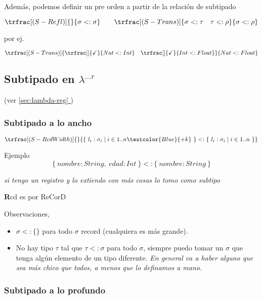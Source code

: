 \documentclass{report}
\newcommand*{\fullref}[1]{\hyperref[{#1}]{\autoref*{#1} \nameref*{#1}}}
\theoremstyle{definition} %
\newenvironment{nota}[1]
    {\begin{leftbar}\textbf{#1}}
    {\end{leftbar}}
\newcommand{\lambdareg}{\lambda^{\dots r}}
\newcommand{\reg}[1]{\{\ #1\ \}}
\newcommand{\treg}[1]{\{ #1 \}}
\newcommand{\deriv}[3]{\trfrac[(#1)]{#2}{#3}}
\newcommand{\derivok}[1]{\trfrac[]{\checkmark}{#1}}
\newcommand{\select}[1]{\textcolor{Blue}{#1}}
\newcommand{\subt}[2]{#1 <: #2}
\begin{document}
Además, podemos definir un pre orden a partir de la relación de subtipado

\[
    \deriv{S-Refl}
        {}
        {\subt{\sigma}{\sigma}}
    \qquad
    \deriv{S-Trans}
        {\subt{\sigma}{\tau} \quad \subt{\tau}{\rho}}
        {\subt{\sigma}{\rho}}
\]

por ej.

\[
    \deriv{S-Trans}
        {\derivok{\subt{Nat}{Int}} \quad \derivok{\subt{Int}{Float}}}
        {\subt{Nat}{Float}}
\]

\subsection{Subtipado en $\lambdareg$}

(ver \fullref{sec:lambda-reg})

\subsubsection{Subtipado \textbf{a lo ancho}}

\[
    \deriv{S-RcdWidth}
        {}
        {
            \subt
                {\reg{l_i : \sigma_i \mid i \in 1..n\select{+k}}}
                {\reg{l_i : \sigma_i \mid i \in 1..n}}
        }
\]

Ejemplo
\[
    \subt{\reg{nombre: String,\ edad: Int}}{\reg{nombre: String}}
\]

\textit{si tengo un registro y lo extiendo con más cosas lo tomo como subtipo}

\begin{nota}
    Rcd es por ReCorD
\end{nota}

Observaciones,

\begin{itemize}
    \item $\subt{\sigma}{\treg{}}$ para todo $\sigma$ record (cualquiera es
    más grande).
    \item No hay tipo $\tau$ tal que $\subt{\tau}{\sigma}$ para todo $\sigma$,
    siempre puedo tomar un $\sigma$ que tenga algún elemento de un tipo
    diferente. \textit{En general va a haber alguno que sea más chico que todos,
    a menos que lo definamos a mano.}
\end{itemize}

\subsubsection{Subtipado \textbf{a lo profundo}}
\end{document}
